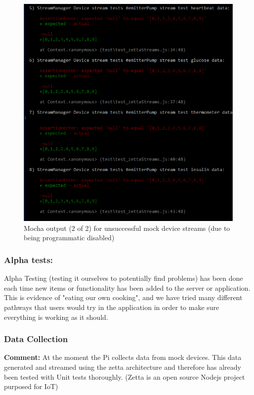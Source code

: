 \documentclass[12pt]{article}
\begin{document}
{\begin{figure}[h!]
	\end{figure}
	\begin{figure}[h!]
	\includegraphics[width=\textwidth]{tests/zettaStream/test-zetta-stream-fail01}
	\caption{Mocha output (2 of 2) for unsuccessful mock device streams (due to being programmatic disabled)}
	\end{figure}
	\subsubsection{Alpha tests:}
	Alpha Testing (testing it ourselves to potentially find problems) has been done each time new items or functionality has been added to the server or application. This is evidence of "eating our own cooking", and we have tried many different pathways that users would try in the application in order to make sure everything is working as it should. 
	\subsubsection{Data Collection}
	\textbf{Comment:} At the moment the Pi collects data from mock devices. This data generated and streamed using the zetta architecture and therefore has already been tested with Unit tests thoroughly. (Zetta is an open source Nodejs project purposed for IoT)
}
\end{document}
